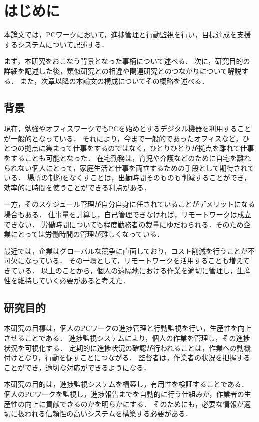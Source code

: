 \chapter{はじめに}
本論文では，PCワークにおいて，進捗管理と行動監視を行い，目標達成を支援するシステムについて記述する．

まず，本研究をおこなう背景となった事柄について述べる．
次に，研究目的の詳細を記述した後，類似研究との相違や関連研究とのつながりについて解説する．
また，次章以降の本論文の構成についてその概略を述べる．

\section{背景}
現在，勉強やオフィスワークでもPCを始めとするデジタル機器を利用することが一般的となっている．
それにより，今まで一般的であったオフィスなど，ひとつの拠点に集まって仕事をするのではなく，ひとりひとりが拠点を離れて仕事をすることも可能となった．
在宅勤務は，育児や介護などのために自宅を離れられない個人にとって，家庭生活と仕事を両立するための手段として期待されている．
場所の制約をなくすことは，出勤時間そのものも削減することができ，効率的に時間を使うことができる利点がある．

一方，そのスケジュール管理が自分自身に任されていることがデメリットになる場合もある．
仕事量を計算し，自己管理できなければ，リモートワークは成立できない．
労働時間についても程度勤務者の裁量にゆだねられる．そのため企業にとっては労働時間の管理が難しくなっている．\cite{Adachi2010}

最近では，企業はグローバルな競争に直面しており，コスト削減を行うことが不可欠になっている．
その一環として，リモートワークを活用することも増えてきている．\cite{Telework2010}
以上のことから，個人の遠隔地における作業を適切に管理し，生産性を維持していく必要があると考えた．

\section{研究目的}
本研究の目標は，個人のPCワークの進捗管理と行動監視を行い，生産性を向上させることである．
進捗監視システムにより，個人の作業を管理し，その進捗状況を可視化する．
定期的に進捗状況の確認が行われることは，作業への動機付けとなり，行動を促すことにつながる．
監督者は，作業者の状況を把握することができ，適切な対応ができるようになる．

本研究の目的は，進捗監視システムを構築し，有用性を検証することである．
個人のPCワークを監視し，進捗報告までを自動的に行う仕組みが，作業者の生産性の向上に貢献できるのかを明らかにする．
そのためにも，必要な情報が適切に扱われる信頼性の高いシステムを構築する必要がある．

